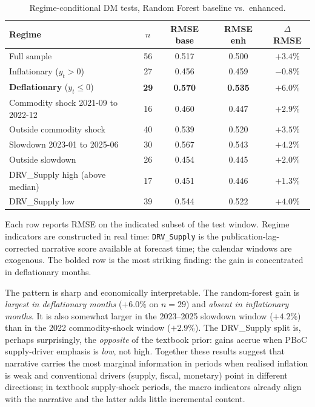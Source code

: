 \documentclass[AER]{AEA}
\begin{document}
\begin{table}[tbp]
\caption{Regime-conditional DM tests, Random Forest baseline vs.\ enhanced.\label{tab:regime}}
\centering
\begin{tabular}{lcccc}
\toprule
Regime & $n$ & RMSE base & RMSE enh & $\Delta$ RMSE \\
\midrule
Full sample            & 56 & 0.517 & 0.500 & $+3.4\%$ \\
\addlinespace
Inflationary ($y_t > 0$)   & 27 & 0.456 & 0.459 & $-0.8\%$ \\
\textbf{Deflationary} ($y_t \le 0$) & \textbf{29} & \textbf{0.570} & \textbf{0.535} & $\boldsymbol{+6.0\%}$ \\
\addlinespace
Commodity shock 2021-09 to 2022-12 & 16 & 0.460 & 0.447 & $+2.9\%$ \\
Outside commodity shock      & 40 & 0.539 & 0.520 & $+3.5\%$ \\
\addlinespace
Slowdown 2023-01 to 2025-06  & 30 & 0.567 & 0.543 & $+4.2\%$ \\
Outside slowdown             & 26 & 0.454 & 0.445 & $+2.0\%$ \\
\addlinespace
DRV\_Supply high (above median) & 17 & 0.451 & 0.446 & $+1.3\%$ \\
DRV\_Supply low                 & 39 & 0.544 & 0.522 & $+4.0\%$ \\
\bottomrule
\end{tabular}
\begin{tablenotes}
Each row reports RMSE on the indicated subset of the test window. Regime
indicators are constructed in real time: \texttt{DRV\_Supply} is the
publication-lag-corrected narrative score available at forecast time; the
calendar windows are exogenous. The bolded row is the most striking
finding: the gain is concentrated in deflationary months.
\end{tablenotes}
\end{table}

The pattern is sharp and economically interpretable. The random-forest gain
is \emph{largest in deflationary months} ($+6.0\%$ on $n=29$) and
\emph{absent in inflationary months}. It is also somewhat larger in the
2023--2025 slowdown window ($+4.2\%$) than in the 2022 commodity-shock
window ($+2.9\%$). The DRV\_Supply split is, perhaps surprisingly, the
\emph{opposite} of the textbook prior: gains accrue when PBoC supply-driver
emphasis is \emph{low}, not high. Together these results suggest that
narrative carries the most marginal information in periods when realised
inflation is weak and conventional drivers (supply, fiscal, monetary) point
in different directions; in textbook supply-shock periods, the macro
indicators already align with the narrative and the latter adds little
incremental content.
\end{document}
